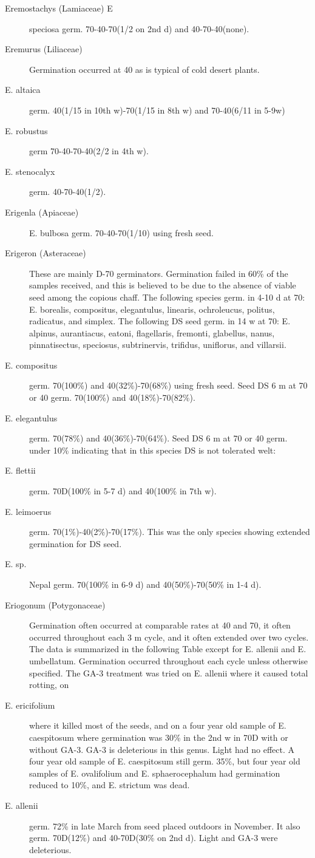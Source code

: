 \begin{description}
\item[Eremostachys (Lamiaceae) E] speciosa germ. 70-40-70(1/2 on 2nd d)
and 40-70-40(none).

\item[Eremurus (Liliaceae)] Germination occurred at 40 as is typical of cold
desert plants.
\item[E. altaica] germ. 40(1/15 in 10th w)-70(1/15 in 8th w) and 70-40(6/11 in 5-9w)
\item[E. robustus] germ 70-40-70-40(2/2 in 4th w).
\item[E. stenocalyx] germ. 40-70-40(1/2).
\item[Erigenla (Apiaceae)] E. bulbosa germ. 70-40-70(1/10) using fresh seed.

\item[Erigeron (Asteraceae)] These are mainly D-70 germinators. Germination
failed in 60\% of the samples received, and this is believed to be due to the absence of
viable seed among the copious chaff. The following species germ. in 4-10 d at 70: E.
borealis, compositus, elegantulus, linearis, ochroleucus, politus, radicatus, and
simplex. The following DS seed germ. in 14 w at 70: E. alpinus, aurantiacus, eatoni,
flagellaris, fremonti, glabellus, nanus, pinnatisectus, speciosus, subtrinervis, trifidus,
uniflorus, and villarsii.
\item[E. compositus] germ. 70(100\%) and 40(32\%)-70(68\%) using fresh seed. Seed
DS 6 m at 70 or 40 germ. 70(100\%) and 40(18\%)-70(82\%).
\item[E. elegantulus] germ. 70(78\%) and 40(36\%)-70(64\%). Seed DS 6 m at 70 or 40
germ. under 10\% indicating that in this species DS is not tolerated welt:
\item[E. flettii] germ. 70D(100\% in 5-7 d) and 40(100\% in 7th w).
\item[E. leimoerus] germ. 70(1\%)-40(2\%)-70(17\%). This was the only species
showing extended germination for DS seed.
\item[E. sp.] Nepal germ. 70(100\% in 6-9 d) and 40(50\%)-70(50\% in 1-4 d).

\item[Eriogonum (Potygonaceae)] Germination often occurred at comparable
rates at 40 and 70, it often occurred throughout each 3 m cycle, and it often extended
over two cycles. The data is summarized in the following Table except for E. allenii
and E. umbellatum. Germination occurred throughout each cycle unless otherwise
specified. The GA-3 treatment was tried on E. allenii where it caused total rotting, on
\item[E. ericifolium] where it killed most of the seeds, and on a four year old sample of E.
caespitosum where germination was 30\% in the 2nd w in 70D with or without GA-3.
GA-3 is deleterious in this genus. Light had no effect. A four year old sample of E.
caespitosum still germ. 35\%, but four year old samples of E. ovalifolium and E.
sphaerocephalum had germination reduced to 10\%, and E. strictum was dead.
\item[E. allenii] germ. 72\% in late March from seed placed outdoors in November. It
also germ. 70D(12\%) and 40-70D(30\% on 2nd d). Light and GA-3 were deleterious.


\end{description}

